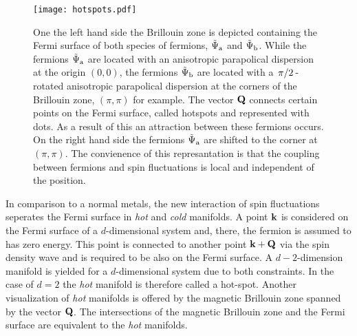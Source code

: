 %
\begin{figure}
	\centering
	\texttt{[image: hotspots.pdf]}
	\caption{
One the left hand side the Brillouin zone is depicted containing the Fermi surface of both species of fermions, $\tilde{\Psi}_{\mathrm{a}}$ and $\tilde{\Psi}_{\mathrm{b}}$.
While the fermions $\tilde{\Psi}_{\mathrm{a}}$ are located with an anisotropic parapolical dispersion at the origin $(0,0)$, the fermions $\tilde{\Psi}_{\mathrm{b}}$ are located with a $\flatfrac{\pi}{2}$-rotated anisotropic parapolical dispersion at the corners of the Brillouin zone, $(\pi,\pi)$ for example.
The vector $\vb{Q}$ connects certain points on the Fermi surface, called hotspots and represented with dots. 
As a result of this an attraction between these fermions occurs.
On the right hand side the fermions $\tilde{\Psi}_{\mathrm{a}}$ are shifted to the corner at $(\pi,\pi)$.
The convienence of this represantation is that the coupling between fermions and spin fluctuations is local and independent of the position.
	}
	\label{fig:hotspots}
\end{figure}
%
In comparison to a normal metals, the new interaction of spin fluctuations seperates the Fermi surface in \emph{hot} and \emph{cold} manifolds.
A point $\vb{k}$ is considered on the Fermi surface of a $d$-dimensional system and, there, the fermion is assumed to has zero energy.
This point is connected to another point $\vb{k}+\vb{Q}$ via the spin density wave and is required to be also on the Fermi surface.
A $d-2$-dimension manifold is yielded for a $d$-dimensional system due to both constraints.
In the case of $d=2$ the \emph{hot} manifold is therefore called a hot-spot.
Another visualization of \emph{hot} manifolds is offered by the magnetic Brillouin zone spanned by the vector $\vb{Q}$.
The intersections of the magnetic Brillouin zone and the Fermi surface are equivalent to the \emph{hot} manifolds.

